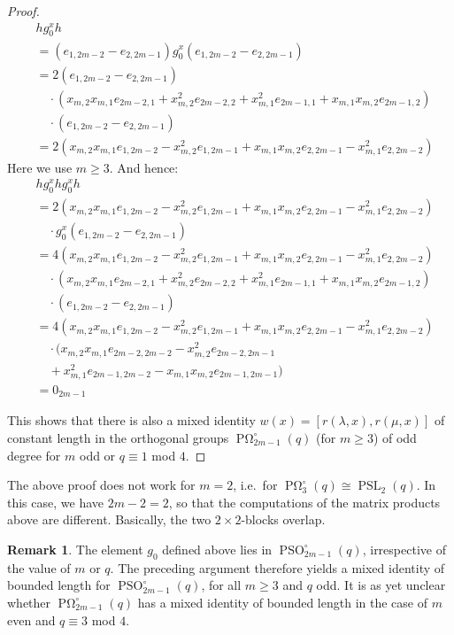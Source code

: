 \documentclass[a4paper,11pt]{amsproc}
\DeclareMathOperator{\PSO}{PSO}
\DeclareMathOperator{\POmega}{P\Omega}
\DeclareMathOperator{\PSL}{PSL}%
\theoremstyle{plain}
\theoremstyle{definition}
\newtheorem{remark}[lemma]{Remark}
\begin{document}
\begin{proof}
		\begin{align*}
			& h g_0^x h \\
			&= (e_{1,2m-2} - e_{2,2m-1})g_0^x (e_{1,2m-2} - e_{2,2m-1}) \\
			&= 2 (e_{1,2m-2} - e_{2,2m-1})\\
			&\quad\cdot (x_{m,2}x_{m,1} e_{2m-2,1} + x^2_{m,2} e_{2m-2,2} + x^2_{m,1} e_{2m-1,1} + x_{m,1}x_{m,2}e_{2m-1,2})\\
			&\quad\cdot (e_{1,2m-2} - e_{2,2m-1})\\
			&= 2(x_{m,2}x_{m,1} e_{1,2m-2} -x^2_{m,2}e_{1,2m-1} + x_{m,1}x_{m,2} e_{2,2m-1} -x^2_{m,1}e_{2,2m-2})
		\end{align*}
		Here we use $m\geq3$.
		And hence:
		\begin{align*}
			& h g_0^x h g_0^x h\\
			&= 2(x_{m,2}x_{m,1} e_{1,2m-2} -x^2_{m,2}e_{1,2m-1} + x_{m,1}x_{m,2} e_{2,2m-1} -x^2_{m,1}e_{2,2m-2})\\
			&\quad\cdot g_0^x (e_{1,2m-2} - e_{2,2m-1}) \\
			&= 4(x_{m,2}x_{m,1} e_{1,2m-2} -x^2_{m,2}e_{1,2m-1} + x_{m,1}x_{m,2} e_{2,2m-1} -x^2_{m,1}e_{2,2m-2})\\
			&\quad\cdot (x_{m,2}x_{m,1} e_{2m-2,1} + x^2_{m,2} e_{2m-2,2} + x^2_{m,1} e_{2m-1,1} + x_{m,1}x_{m,2}e_{2m-1,2})\\
			&\quad\cdot (e_{1,2m-2} - e_{2,2m-1})\\
			&= 4(x_{m,2}x_{m,1} e_{1,2m-2} -x^2_{m,2}e_{1,2m-1} + x_{m,1}x_{m,2} e_{2,2m-1} -x^2_{m,1}e_{2,2m-2})\\
			&\quad\cdot (x_{m,2}x_{m,1} e_{2m-2,2m-2} - x^2_{m,2} e_{2m-2,2m-1}\\ 
			&\quad+ x^2_{m,1} e_{2m-1,2m-2}-x_{m,1}x_{m,2}e_{2m-1,2m-1})\\
			&= 0_{2m-1}
		\end{align*}
		
		This shows that there is also a mixed identity $w(x)=[r(\lambda,x),r(\mu,x)]$ of constant length in the orthogonal groups $\POmega^\circ_{2m-1}(q)$ (for $m\geq 3$) of odd degree for $m$ odd or $q\equiv 1$ mod $4$.
	\end{proof}
	
	The above proof does not work for $m=2$, i.e.\ for $\POmega^\circ_3(q)\cong\PSL_2(q)$. In this case, we have $2m-2=2$, so that the computations of the matrix products above are different. Basically, the two $2\times 2$-blocks overlap.
	
	\begin{remark} \label{rem:pso}
		The element $g_0$ defined above lies in $\PSO_{2m-1}^{\circ} (q)$, irrespective of the value of $m$ or $q$. The preceding argument therefore yields a mixed identity of bounded length for $\PSO_{2m-1} ^{\circ} (q)$, for all $m \geq 3$ and $q$ odd. It is as yet unclear whether $\POmega_{2m-1} ^{\circ} (q)$ has a mixed identity of bounded length in the case of $m$ even and $q \equiv 3$ mod $4$.
	\end{remark}
	
\end{document}
